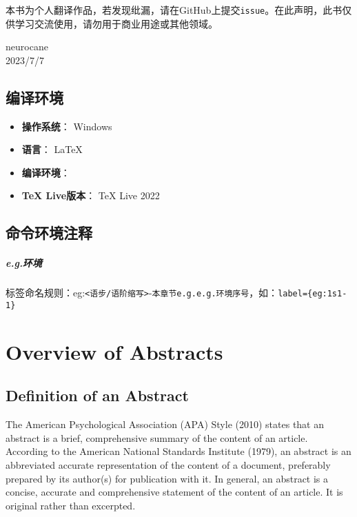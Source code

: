 \documentclass{ctexbook}
\begin{document}
本书为个人翻译作品，若发现纰漏，请在GitHub上提交\verb|issue|。在此声明，此书仅供学习交流使用，请勿用于商业用途或其他领域。

\vfill

\begin{flushright}
    neurocane\\
    2023/7/7
\end{flushright}

\newpage

\section*{编译环境}

\begin{itemize}
    \item \textbf{操作系统}： Windows
    \item \textbf{语言}： \LaTeX
    \item \textbf{编译环境}： \XeLaTeX
    \item \textbf{TeX Live版本}： TeX Live 2022
\end{itemize}

\section*{命令环境注释}

\paragraph*{e.g.环境} 标签命名规则：eg:\verb|<语步/语阶缩写>|-\verb|本章节e.g.e.g.环境序号|，如：\verb|label={eg:1s1-1}|

\tableofcontents

\mainmatter


\chapter{Overview of Abstracts}\label{chapter1}
\section{Definition of an Abstract}

The American Psychological Association (APA) Style (2010) states that an abstract is a brief, comprehensive summary of the content of an article. According to the American National Standards Institute (1979), an abstract is an abbreviated accurate representation of the content of a document, preferably prepared by its author(s) for publication with it. In general, an abstract is a concise, accurate and comprehensive statement of the content of an article. It is original rather than excerpted.
\end{document}
